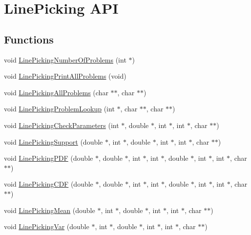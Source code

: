\hypertarget{group__api}{\section{Line\-Picking A\-P\-I}
\label{group__api}
}
\subsection*{Functions}
\begin{DoxyCompactItemize}
\item 
void \hyperlink{group__api_gab0e3cb9eaef2a9f040f1135eee394f28}{Line\-Picking\-Number\-Of\-Problems} (int $\ast$)
\item 
void \hyperlink{group__api_ga1a1c27d3c46da382a0443f810628a8ac}{Line\-Picking\-Print\-All\-Problems} (void)
\item 
void \hyperlink{group__api_gaf04b41252ebd1a3013b6bcb4dbbf3649}{Line\-Picking\-All\-Problems} (char $\ast$$\ast$, char $\ast$$\ast$)
\item 
void \hyperlink{group__api_ga146eea4bf38bd6e3812ea47ae2ac57a7}{Line\-Picking\-Problem\-Lookup} (int $\ast$, char $\ast$$\ast$, char $\ast$$\ast$)
\item 
void \hyperlink{group__api_gac55d1d166b33c8906ceccbb37010ddb0}{Line\-Picking\-Check\-Parameters} (int $\ast$, double $\ast$, int $\ast$, int $\ast$, char $\ast$$\ast$)
\item 
void \hyperlink{group__api_ga0aec0b2f87903f4bf4ad3011a99b3446}{Line\-Picking\-Support} (double $\ast$, int $\ast$, double $\ast$, int $\ast$, int $\ast$, char $\ast$$\ast$)
\item 
void \hyperlink{group__api_ga8feba9835984bd74f3d919f51389e573}{Line\-Picking\-P\-D\-F} (double $\ast$, double $\ast$, int $\ast$, int $\ast$, double $\ast$, int $\ast$, int $\ast$, char $\ast$$\ast$)
\item 
void \hyperlink{group__api_ga445ba2c007d60d789747cecbd5f874b9}{Line\-Picking\-C\-D\-F} (double $\ast$, double $\ast$, int $\ast$, int $\ast$, double $\ast$, int $\ast$, int $\ast$, char $\ast$$\ast$)
\item 
void \hyperlink{group__api_ga39879835a11f7af8bf65699f9d83a5cb}{Line\-Picking\-Mean} (double $\ast$, int $\ast$, double $\ast$, int $\ast$, int $\ast$, char $\ast$$\ast$)
\item 
void \hyperlink{group__api_ga08fecba488534373e8d1710f273bc49c}{Line\-Picking\-Var} (double $\ast$, int $\ast$, double $\ast$, int $\ast$, int $\ast$, char $\ast$$\ast$)
\item 

\end{DoxyCompactItemize}
